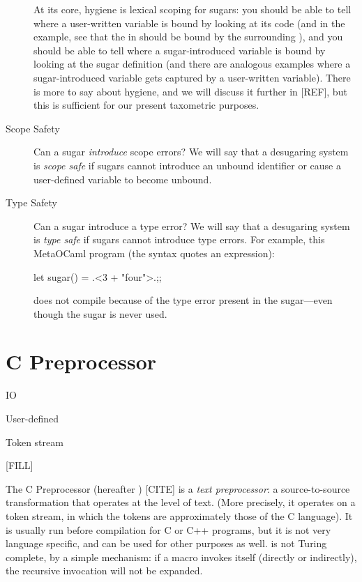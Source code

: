 \begin{description}
    At its core, hygiene is lexical scoping for sugars: you should be
    able to tell where a user-written variable is bound by looking at
    its code (and in the example, see that the  in  should be bound by the surrounding ), and
    you should be able to tell where a sugar-introduced variable is
    bound by looking at the sugar definition (and there are analogous
    examples where a sugar-introduced variable gets captured by a
    user-written variable). There is more to say about hygiene, and we
    will discuss it further in [REF], but this is sufficient for our
    present taxometric purposes.
    
  \item[Scope Safety] Can a sugar \emph{introduce} scope errors?  We
    will say that a desugaring system is \emph{scope safe} if sugars
    cannot introduce an unbound identifier or cause a user-defined
    variable to become unbound.

  \item[Type Safety] Can a sugar introduce a type error? We will say
    that a desugaring system is \emph{type safe} if sugars cannot
    introduce type errors. For example, this MetaOCaml program (the
     syntax quotes an expression):
\begin{Codes}
let sugar() = .<3 + "four">.;;
\end{Codes}
    does not compile because of the type error present in the
    sugar---even though the sugar is never used.
\end{description}

\section{C Preprocessor} \label{sec:cpre}

 IO

 User-defined

 Token stream

 [FILL]

The C Preprocessor (hereafter ) [CITE] is a \emph{text
  preprocessor}: a source-to-source transformation that operates at
the level of text. (More precisely, it operates on a token stream, in
which the tokens are approximately those of the C language). It is
usually run before compilation for C or C++ programs, but it is not
very language specific, and can be used for other purposes as well.
 is not Turing complete, by a simple mechanism: if a macro
invokes itself (directly or indirectly), the recursive invocation
will not be expanded.

